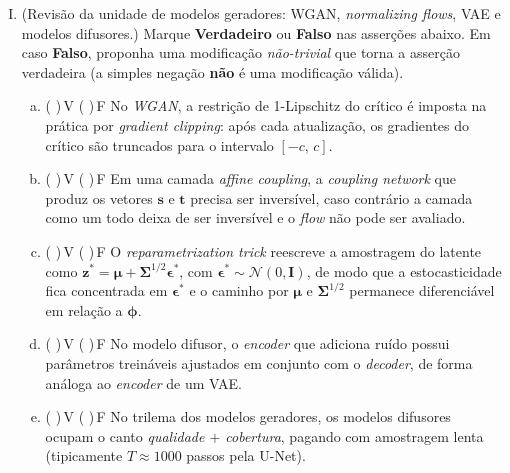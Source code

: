 \documentclass{dlproblemset}
\begin{document}
\begin{enumerate}[I)]
\item (Revisão da unidade de modelos geradores: WGAN, \textit{normalizing flows}, VAE e modelos difusores.) Marque \textbf{Verdadeiro} ou \textbf{Falso} nas asserções abaixo. Em caso \textbf{Falso}, proponha uma modificação \emph{não-trivial} que torna a asserção verdadeira (a simples negação \textbf{não} é uma modificação válida).
\begin{enumerate}[(a)]
    \item ( )\,V \quad ( )\,F \quad No \textit{WGAN}, a restrição de 1-Lipschitz do crítico é imposta na prática por \textit{gradient clipping}: após cada atualização, os gradientes do crítico são truncados para o intervalo $[-c,\,c]$.
    \item ( )\,V \quad ( )\,F \quad Em uma camada \textit{affine coupling}, a \textit{coupling network} que produz os vetores $\mathbf{s}$ e $\mathbf{t}$ precisa ser inversível, caso contrário a camada como um todo deixa de ser inversível e o \textit{flow} não pode ser avaliado.
    \item ( )\,V \quad ( )\,F \quad O \textit{reparametrization trick} reescreve a amostragem do latente como $\mathbf{z}^{*} = \boldsymbol{\mu} + \boldsymbol{\Sigma}^{1/2}\boldsymbol{\epsilon}^{*}$, com $\boldsymbol{\epsilon}^{*} \sim \mathcal{N}(0,\mathbf{I})$, de modo que a estocasticidade fica concentrada em $\boldsymbol{\epsilon}^{*}$ e o caminho por $\boldsymbol{\mu}$ e $\boldsymbol{\Sigma}^{1/2}$ permanece diferenciável em relação a $\boldsymbol{\phi}$.
    \item ( )\,V \quad ( )\,F \quad No modelo difusor, o \textit{encoder} que adiciona ruído possui parâmetros treináveis ajustados em conjunto com o \textit{decoder}, de forma análoga ao \textit{encoder} de um VAE.
    \item ( )\,V \quad ( )\,F \quad No trilema dos modelos geradores, os modelos difusores ocupam o canto \emph{qualidade $+$ cobertura}, pagando com amostragem lenta (tipicamente $T \approx 1000$ passos pela U-Net).
\end{enumerate}


\end{enumerate}
\end{document}
